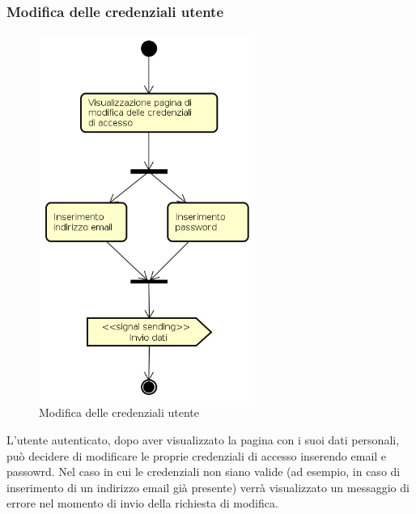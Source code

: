 \subsubsection{Modifica delle credenziali utente}
\begin{figure}[H]
\begin{center}
\includegraphics[height=12cm]{res/sections/backend/activities/modificaCredenziali.png}
\caption{Modifica delle credenziali utente}
\end{center}
\end{figure}
L'utente autenticato, dopo aver visualizzato la pagina con i suoi dati personali, può decidere di modificare le proprie credenziali di accesso inserendo email e passowrd. Nel caso in cui le credenziali non siano valide (ad esempio, in caso di inserimento di un indirizzo email già presente) verrà visualizzato un messaggio di errore nel momento di invio della richiesta di modifica.
